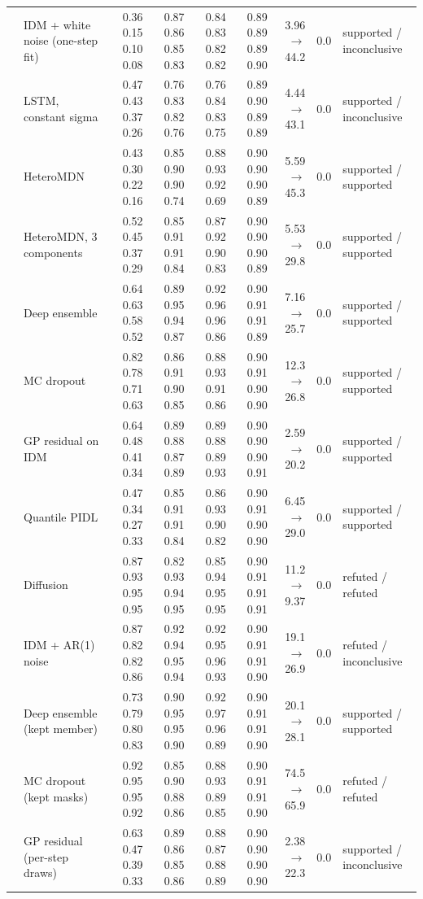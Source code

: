 \begin{longtable}{llrrrrrrl}
 & IDM + white noise (one-step fit) & 0.36 0.15 0.10 0.08 & 0.87 0.86 0.85 0.83 & 0.84 0.83 0.82 0.82 & 0.89 0.89 0.89 0.90 & 3.96 $\rightarrow$ 44.2 & 0.0 & supported / inconclusive \\
 & LSTM, constant sigma & 0.47 0.43 0.37 0.26 & 0.76 0.83 0.82 0.76 & 0.76 0.84 0.83 0.75 & 0.89 0.90 0.89 0.89 & 4.44 $\rightarrow$ 43.1 & 0.0 & supported / inconclusive \\
 & HeteroMDN & 0.43 0.30 0.22 0.16 & 0.85 0.90 0.90 0.74 & 0.88 0.93 0.92 0.69 & 0.90 0.90 0.90 0.89 & 5.59 $\rightarrow$ 45.3 & 0.0 & supported / supported \\
 & HeteroMDN, 3 components & 0.52 0.45 0.37 0.29 & 0.85 0.91 0.91 0.84 & 0.87 0.92 0.90 0.83 & 0.90 0.90 0.90 0.89 & 5.53 $\rightarrow$ 29.8 & 0.0 & supported / supported \\
 & Deep ensemble & 0.64 0.63 0.58 0.52 & 0.89 0.95 0.94 0.87 & 0.92 0.96 0.96 0.86 & 0.90 0.91 0.91 0.89 & 7.16 $\rightarrow$ 25.7 & 0.0 & supported / supported \\
 & MC dropout & 0.82 0.78 0.71 0.63 & 0.86 0.91 0.90 0.85 & 0.88 0.93 0.91 0.86 & 0.90 0.91 0.90 0.90 & 12.3 $\rightarrow$ 26.8 & 0.0 & supported / supported \\
 & GP residual on IDM & 0.64 0.48 0.41 0.34 & 0.89 0.88 0.87 0.89 & 0.89 0.88 0.89 0.93 & 0.90 0.90 0.90 0.91 & 2.59 $\rightarrow$ 20.2 & 0.0 & supported / supported \\
 & Quantile PIDL & 0.47 0.34 0.27 0.33 & 0.85 0.91 0.91 0.84 & 0.86 0.93 0.90 0.82 & 0.90 0.91 0.90 0.90 & 6.45 $\rightarrow$ 29.0 & 0.0 & supported / supported \\
 & Diffusion & 0.87 0.93 0.95 0.95 & 0.82 0.93 0.94 0.95 & 0.85 0.94 0.95 0.95 & 0.90 0.91 0.91 0.91 & 11.2 $\rightarrow$ 9.37 & 0.0 & refuted / refuted \\
 & IDM + AR(1) noise & 0.87 0.82 0.82 0.86 & 0.92 0.94 0.95 0.94 & 0.92 0.95 0.96 0.93 & 0.90 0.91 0.91 0.90 & 19.1 $\rightarrow$ 26.9 & 0.0 & refuted / inconclusive \\
 & Deep ensemble (kept member) & 0.73 0.79 0.80 0.83 & 0.90 0.95 0.95 0.90 & 0.92 0.97 0.96 0.89 & 0.90 0.91 0.91 0.90 & 20.1 $\rightarrow$ 28.1 & 0.0 & supported / supported \\
 & MC dropout (kept masks) & 0.92 0.95 0.95 0.92 & 0.85 0.90 0.88 0.86 & 0.88 0.93 0.89 0.85 & 0.90 0.91 0.91 0.90 & 74.5 $\rightarrow$ 65.9 & 0.0 & refuted / refuted \\
 & GP residual (per-step draws) & 0.63 0.47 0.39 0.33 & 0.89 0.86 0.85 0.86 & 0.88 0.87 0.88 0.89 & 0.90 0.90 0.90 0.90 & 2.38 $\rightarrow$ 22.3 & 0.0 & supported / inconclusive \\
\end{longtable}
\endgroup
